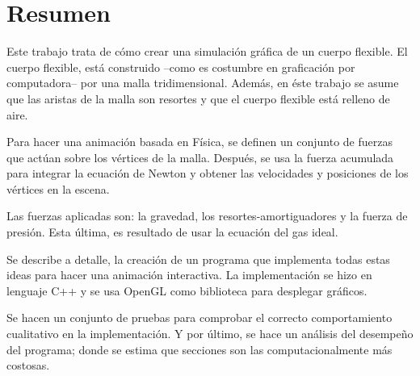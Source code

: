 \chapter*{Resumen}
Este trabajo trata de cómo crear una simulación gráfica de un cuerpo flexible.
El cuerpo flexible, está construido --como es costumbre en graficación por computadora-- por una malla tridimensional. Además, en éste trabajo se asume que las aristas de la malla son resortes y que el cuerpo flexible está relleno de aire.

Para hacer una animación basada en Física, se definen un conjunto de fuerzas que actúan sobre los vértices de la malla. Después, se usa la fuerza acumulada para integrar la ecuación de Newton y obtener las velocidades y posiciones de los vértices en la escena.

Las fuerzas aplicadas son: la gravedad, los resortes-amortiguadores y la fuerza de presión. Esta última, es resultado de usar la ecuación del gas ideal.

Se describe a detalle, la creación de un programa que implementa todas estas ideas para hacer una animación interactiva. La implementación se hizo en lenguaje C++ y se usa OpenGL como biblioteca para desplegar gráficos.

Se hacen un conjunto de pruebas para comprobar el correcto comportamiento cualitativo en la implementación. Y por último, se hace un análisis del desempeño del programa; donde se estima que secciones son las computacionalmente más costosas.

